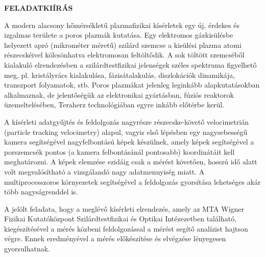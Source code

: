 \clearpage
\begin{center}
\large
\textbf{FELADATKIÍRÁS}\\
\end{center}

A modern alacsony hőmérsékletű plazmafizikai kísérletek egy új, érdekes és izgalmas területe a poros plazmák
kutatása. Egy elektromos gázkisülésbe helyezett apró (mikrométer méretű) szilárd szemcse a kisülési plazma
atomi részecskéivel kölcsönhatva elektromosan feltöltődik. A sok töltött szemcséből kialakuló elrendezésben a
szilárdtestfizikai jelenségek széles spektruma figyelhető meg, pl. kristályrács kialakulása, fázisátalakulás,
diszlokációk dinamikája, transzport folyamatok, stb. Poros plazmákat jelenleg leginkább alapkutatásokban
alkalmaznak, de jelentőségük az elektronikai gyártásban, fúziós reaktorok üzemeltelésében, Teraherz
technológiában egyre inkább előtérbe kerül.

A kísérleti adatgyűjtés és feldolgozás nagyrésze részecske-követő velocimetrián (particle tracking velocimetry)
alapul, vagyis első lépésben egy nagysebességű kamera segítségével nagyfelbontású képek készülnek, amely
képek segítségével a porszemcsék pontos (a kamera felbontásánál pontosabb) koordinátáit kell meghatározni. A
képek elemzése ezidáig csak a mérést követően, hosszú idő alatt volt megvalósítható a vizsgálandó nagy
adatmennyiség miatt. A multiprocesszoros környezetek segítségével a feldolgozás gyorsítása lehetséges akár
több nagyságrenddel is.

A jelölt feladata, hogy a meglévő kísérleti elrendezés, amely az MTA Wigner Fizikai Kutatóközpont
Szilárdtestfizikai és Optikai Intézezetben található, kiegészítésével a mérés közbeni feldolgozással a mérést
segítő analízist hajtson végre. Ennek eredményével a mérés előkészítése és elvégzése lényegesen gyorsulhatnak.

